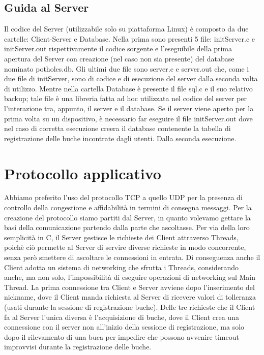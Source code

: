 \documentclass[a4paper,11pt]{report}
\begin{document}
\section{\large{\textbf{Guida al Server}}}
Il codice del Server (utilizzabile solo su piattaforma Linux) è composto da due cartelle: Client-Server e Database. \newline
Nella prima sono presenti 5 file: initServer.c e initServer.out rispettivamente il codice sorgente e l'eseguibile della prima apertura del Server con creazione (nel caso non sia presente) del database nominato potholes.db. Gli ultimi due file sono server.c e server.out che, come i due file di initServer, sono di codice e di esecuzione del server dalla seconda volta di utilizzo.\newline
Mentre nella cartella Database è presente il file sql.c e il suo relativo backup; tale file è una libreria fatta ad hoc utilizzata nel codice del server per l'interazione tra, appunto, il server e il database.
Se il server viene aperto per la prima volta su un dispositivo, è necessario far eseguire il file initServer.out dove nel caso di corretta esecuzione creera il database contenente la tabella di registrazione delle buche incontrate dagli utenti. Dalla seconda esecuzione.


\newpage


\chapter{\Large{\textbf{Protocollo applicativo}}}

Abbiamo preferito l'uso del protocollo TCP a quello UDP per la presenza di controllo della congestione e affidabilità in termini di consegna messaggi. Per la creazione del protocollo siamo partiti dal Server, in quanto volevamo gettare la basi della comunicazione partendo dalla parte che ascoltasse. \newline
Per via della loro semplicità in C, il Server gestisce le richieste dei Client attraverso Threads, poichè ciò permette al Server di servire diverse richieste in modo concorrente, senza però smettere di ascoltare le connessioni in entrata. Di conseguenza anche il Client adotta un sistema di networking che sfrutta i Threads, considerando anche, ma non solo, l'impossibilità di eseguire operazioni di networking sul Main Thread.\newline
La prima connessione tra Client e Server avviene dopo l'inserimento del nickname, dove il Client manda richiesta al Server di ricevere valori di tolleranza (usati durante la sessione di registrazione buche). Delle tre richieste che il Client fa al Server l'unica diversa è l'acquisizione di buche, dove il Client crea una connessione con il server non all'inizio della sessione di registrazione, ma solo dopo il rilevamento di una buca per impedire che possono avvenire timeout improvvisi durante la registrazione delle buche. 
\newpage
\end{document}
